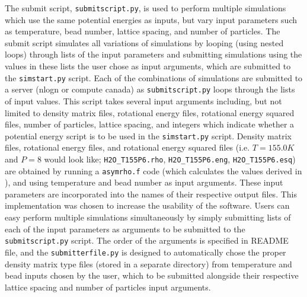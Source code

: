 \documentclass{ece}
\begin{document}
The submit script, \texttt{submitscript.py}, is used to perform multiple simulations which use the same potential energies as inputs, but vary input parameters such as temperature, bead number, lattice spacing, and number of particles. The submit script simulates all variations of simulations by looping (using nested loops) through lists of the input parameters and submitting simulations using the values in these lists the user chose as input arguments, which are submitted to the \texttt{simstart.py} script. Each of the combinations of simulations are submitted to a server (nlogn or compute canada) as \texttt{submitscript.py} loops through the lists of input values. This script takes several input arguments including, but not limited to density matrix files, rotational energy files, rotational energy squared files, number of particles, lattice spacing, and integers which indicate whether a potential energy script is to be used in the \texttt{simstart.py} script. Density matrix files, rotational energy files, and rotational energy squared files (i.e. \begin{math} T = 155.0 K \end{math} and \begin{math} P = 8 \end{math} would look like; \texttt{H2O\_T155P6.rho}, \texttt{H2O\_T155P6.eng}, \texttt{H2O\_T155P6.esq}) are obtained by running a \texttt{asymrho.f} code (which calculates the values derived in ), and using temperature and bead number as input arguments. These input parameters are incorporated into the names of their respective output files. This implementation was chosen to increase the usability of the software. Users can easy perform multiple simulations simultaneously by simply submitting lists of each of the input parameters as arguments to be submitted to the \texttt{submitscript.py} script. The order of the arguments is specified in README file, and the \texttt{submitterfile.py} is designed to automatically chose the proper density matrix type files (stored in a separate directory) from temperature and bead inputs chosen by the user, which to be submitted alongside their respective lattice spacing and number of particles input arguments.
\end{document}
